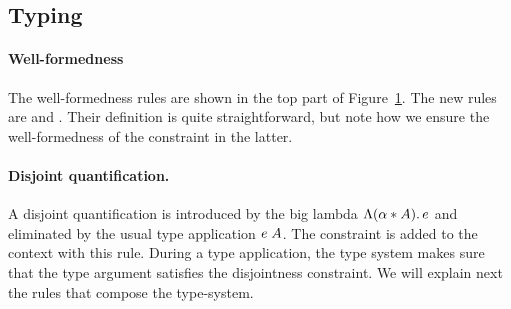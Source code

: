 
%
%

\subsection{Typing}

\begin{figure}[!t]
  \label{fig:wf}
\end{figure}



\paragraph{Well-formedness}
The well-formedness rules are shown in the top part of Figure~\ref{fig:wf}. 
The new rules are  and
. 
Their definition is quite straightforward, but note how we ensure the well-formedness 
of the constraint in the latter. 

\paragraph{Disjoint quantification.} A disjoint quantification is introduced by
the big lambda $\Lambda (\alpha * A).\, e$ and eliminated by the usual type application 
$e \; A$. 
The constraint is added to the context with this rule. 
During a type application, the type system makes sure that the type argument
satisfies the disjointness constraint.
We will explain next the rules that compose the type-system.

